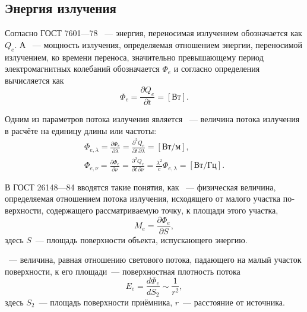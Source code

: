 \subsection{Энергия излучения}
Согласно ГОСТ 7601---78 ~--- энергия, переносимая излучением обозначается как $Q_e$. А ~--- мощность излучения, определяемая отношением энергии, переносимой излучением, ко времени переноса,  значительно превышающему период электромагнитных колебаний обозначается $\Phi_e$ и согласно определения вычисляется как
\begin{equation}
	\Phi_e = \frac{\partial Q_e}{\partial t} = [\text{Вт}].
\end{equation}

Одним из параметров потока излучения является ~--- величина потока излучения в расчёте на единицу длины или частоты:
\begin{gather*}
    \Phi_{e, \lambda}
    = \frac{\partial \Phi_e}{\partial \lambda} 
    = \frac{\partial^2 Q_e}{\partial t \, \partial \lambda}
    = [\text{Вт/м}],\\
    \Phi_{e, \nu} 
    = \frac{\partial \Phi_e}{\partial \nu} 
    = \frac{\partial^2 Q_e}{\partial t \, \partial \nu}
    = \frac{\lambda^2}{c}\Phi_{e, \lambda}
    = [\text{Вт/Гц}].
\end{gather*}


В ГОСТ 26148---84 вводятся такие понятия, как ~--- физическая величина, определяемая отношением потока излучения, исходящего от малого участка по­верхности, содержащего рассматри­ваемую точку, к площади этого участка,
\begin{equation}
	M_e = \frac{\partial \Phi_e}{\partial S},
\end{equation}
здесь $S$~--- площадь поверхности объекта, испускающего энергию.

~--- величина, равная отношению светового потока, падающего на малый участок поверхности, к его площади~--- поверхностная плотность потока
\begin{equation}
	E_e = \frac{d\Phi_e}{dS_2} \sim \frac{1}{r^2},
\end{equation}
здесь $S_2$~--- площадь поверхности приёмника, $r$~--- расстояние от источника.

